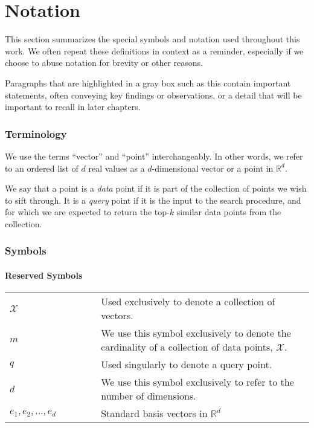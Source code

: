 \chapter*{Notation}
\label{appendix:notation}

This section summarizes the special symbols and notation used throughout this work.
We often repeat these definitions in context as a reminder, especially if we choose to
abuse notation for brevity or other reasons.

\begin{svgraybox}
    Paragraphs that are highlighted in a gray box such as this contain important
    statements, often conveying key findings or observations, or a detail that will
    be important to recall in later chapters.
\end{svgraybox}

\subsection*{Terminology}
We use the terms ``vector'' and ``point'' interchangeably.
In other words, we refer to an ordered list of $d$ real values
as a $d$-dimensional vector or a point in $\mathbb{R}^d$.

We say that a point is a \emph{data} point if it is part of the collection
of points we wish to sift through. It is a \emph{query} point if it is the input
to the search procedure, and for which we are expected to return the top-$k$
similar data points from the collection.


\subsection*{Symbols}

\subsubsection*{Reserved Symbols}
\begin{longtable*}{p{0.3\linewidth}p{0.7\linewidth}}
$\mathcal{X}$ & Used exclusively to denote a collection of vectors. \\
$m$ & We use this symbol exclusively to denote the cardinality of a collection of data points, $\mathcal{X}$. \\
$q$ & Used singularly to denote a query point. \\
$d$ & We use this symbol exclusively to refer to the number of dimensions. \\
$e_1, e_2, \ldots, e_d$ & Standard basis vectors in $\mathbb{R}^d$ \\
\end{longtable*}

